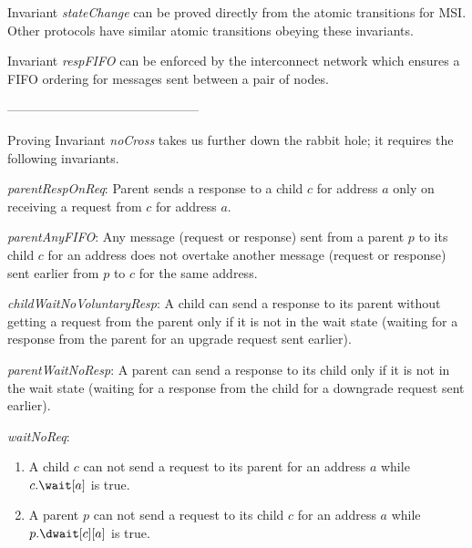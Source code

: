 Invariant \textit{stateChange} can be proved directly from the atomic
transitions for MSI. Other protocols have similar atomic transitions obeying
these invariants.

Invariant \textit{respFIFO} can be enforced by the interconnect network which
ensures a FIFO ordering for messages sent between a pair of nodes.

---------------------------------------------

Proving Invariant \textit{noCross} takes us further down the rabbit
hole; it requires the following invariants.

\begin{inv}
\textit{parentRespOnReq}: Parent sends a response to a child $c$ for address
$a$ only on receiving a request from $c$ for address $a$.
\label{parentRespOnReq}
\end{inv}

\begin{inv}
\textit{parentAnyFIFO}: Any message (request or response) sent from a parent
$p$ to its child $c$ for an address does not overtake another message (request
or response) sent earlier from $p$ to $c$ for the same address.
\label{parentRespReqFIFO}
\end{inv}

\begin{inv}
\textit{childWaitNoVoluntaryResp}: A child can send a response to its parent
without getting a request from the parent only if it is not in the wait state
(\ie waiting for a response from the parent for an upgrade request sent
earlier).
\label{childWaitNoVoluntaryResp}
\end{inv}

\begin{inv}
\textit{parentWaitNoResp}: A parent can send a response to its child
only if it is not in the wait state (\ie waiting for a response from the child
for a downgrade request sent earlier).
\label{parentWaitNoResp}
\end{inv}

\begin{inv}
\textit{waitNoReq}:
\begin{enumerate}
\item A child $c$ can not send a request to its parent for an address $a$ while
$c.\wait[a]$ is true.
\item A parent $p$ can not send a request to its child $c$ for an address $a$
while $p.\dwait[c][a]$ is true.
\end{enumerate}
\end{inv}

